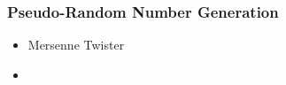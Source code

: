 \documentclass[MAIN.tex]{subfiles}
\begin{document}
 
\begin{frame}[fragile]
	\frametitle{Pseudo-Random Number Generation}
	\begin{itemize}
	\item Mersenne Twister
	\item
\end{itemize}
\end{frame}
\end{document}
